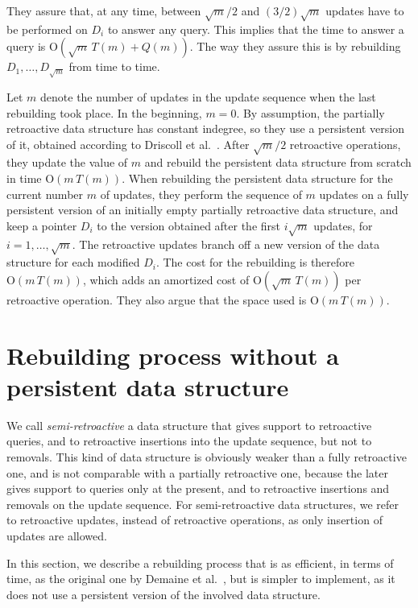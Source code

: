 \documentclass[reqno,11pt]{amsart}
\newcommand{\Oh}{\mathrm{O}}
\begin{document}
They assure that, at any time, between $\sqrt{m}/2$ and $(3/2)\sqrt{m}$ 
updates have to be performed on $D_i$ to answer any query.  
This implies that the time to answer a query is $\Oh(\sqrt{m}\,T(m)+Q(m))$.  
The way they assure this is by rebuilding $D_1,\ldots,D_{\sqrt{m}}$ from time to time. 

Let $m$ denote the number of updates in the update sequence when the last rebuilding took place.
In the beginning, $m=0$. 
By assumption, the partially retroactive data structure has constant indegree, so they use 
a persistent version of it, obtained according to Driscoll et al.~\cite{DriscollSST1989}.
After $\sqrt{m}/2$ retroactive operations, they update the value of $m$ and 
rebuild the persistent data structure from scratch in time $\Oh(m\,T(m))$. 
When rebuilding the persistent data structure for the current number $m$ of updates, 
they perform the sequence of $m$ updates on a fully persistent version of an 
initially empty partially retroactive data structure, and keep a pointer $D_i$ 
to the version obtained after the first $i\sqrt{m}$ updates, for $i = 1,\ldots,\sqrt{m}$. 
The retroactive updates branch off 
a new version of the data structure for each modified $D_i$.  
The cost for the rebuilding is therefore $\Oh(m\,T(m))$, 
which adds an amortized cost of $\Oh(\sqrt{m}\,T(m))$ per retroactive operation. 
They also argue that the space used is $\Oh(m\,T(m))$. 

\section{Rebuilding process without a persistent data structure}\label{sec:rebuilding}

We call \emph{semi-retroactive} a data structure that gives support to retroactive 
queries, and to retroactive insertions into the update sequence, but not to removals. 
This kind of data structure is obviously weaker than a fully retroactive one, and
is not comparable with a partially retroactive one, because the later gives support 
to queries only at the present, and to retroactive insertions and removals on the 
update sequence.  For semi-retroactive data structures, we refer to retroactive 
updates, instead of retroactive operations, as only insertion of updates are allowed. 

In this section, we describe a rebuilding process that is as efficient, in terms 
of time, as the original one by Demaine et al.~\cite{DemaineIL2007}, but is simpler 
to implement, as it does not use a persistent version of the involved data structure. 
\end{document}
